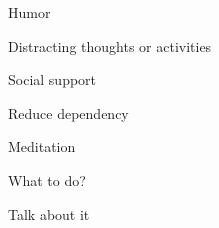 \documentclass[aspectratio=169]{beamer}
\begin{document}
\begin{frame}
  \begin{center}
    \Huge Humor
    \\ \small \cite{hh15}
  \end{center}
\end{frame}

\begin{frame}
  \begin{center}
    \Huge Distracting thoughts or activities
    \\ \small \cite{hh15}
  \end{center}
\end{frame}

\begin{frame}
  \begin{center}
    \Huge Social support
    \\ \small \cite{caltech}
  \end{center}
\end{frame}

\begin{frame}
  \begin{center}
    \Huge Reduce dependency
    \\ \small \cite{langford93}
  \end{center}
\end{frame}

\begin{frame}
  \begin{center}
    \Huge Meditation
  \end{center}
\end{frame}

\begin{frame}
  \begin{center}
    \Huge What to do?
  \end{center}
\end{frame}

\begin{frame}
  \begin{center}
    \Huge Talk about it
    \small
  \end{center}
\end{frame}
\end{document}
